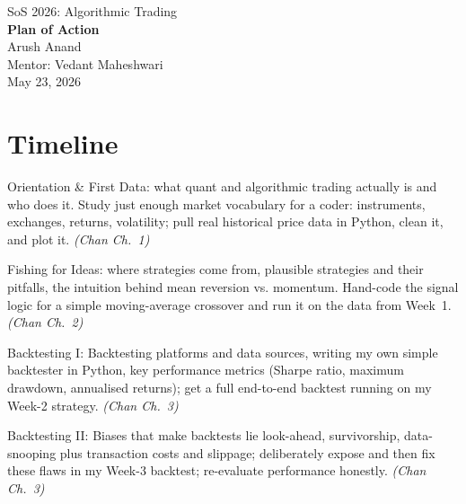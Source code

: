 \documentclass[11pt,a4paper]{article}
\begin{document}
\begin{center}
  {\LARGE SoS 2026: Algorithmic Trading}\\[6pt]
  {\large\textbf{Plan of Action}}\\[10pt]
  Arush Anand\\
  Mentor: Vedant Maheshwari\\[6pt]
  May 23, 2026
\end{center}

\bigskip

\section{Timeline}


\begin{weeklist}

\item[Week 1] Orientation \& First Data: what quant and algorithmic trading
  actually is and who does it. Study just enough market vocabulary for a coder:
  instruments, exchanges, returns, volatility; pull real historical price data
  in Python, clean it, and plot it. \textit{(Chan Ch.~1)}

\item[Week 2] Fishing for Ideas: where strategies come from, plausible
  strategies and their pitfalls, the intuition behind mean reversion vs.
  momentum. Hand-code the signal logic for a simple moving-average crossover
  and run it on the data from Week~1. \textit{(Chan Ch.~2)}

\item[Week 3] Backtesting I: Backtesting platforms and
  data sources, writing my own simple backtester in Python, key performance
  metrics (Sharpe ratio, maximum drawdown, annualised returns); get a full
  end-to-end backtest running on my Week-2 strategy. \textit{(Chan Ch.~3)}

\item[Week 4] Backtesting II: Biases that make backtests lie
  look-ahead, survivorship, data-snooping plus transaction costs and
  slippage; deliberately expose and then fix these flaws in my Week-3
  backtest; re-evaluate performance honestly. \textit{(Chan Ch.~3)}

\end{weeklist}
\end{document}

